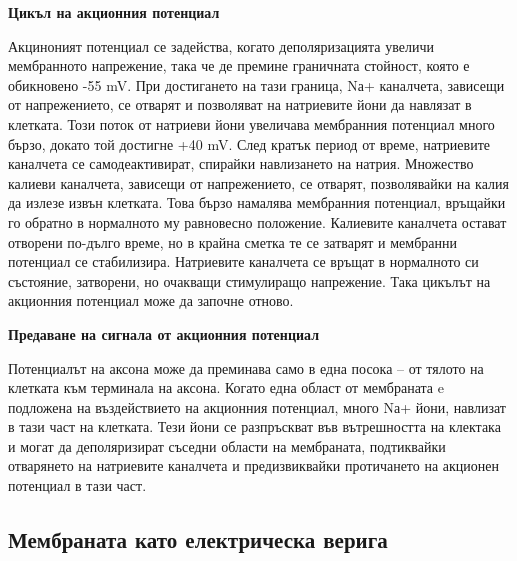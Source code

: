 \documentclass{article}
\begin{document}
\vspace{5mm} %
\textbf{Цикъл на акционния потенциал}

Акциноният потенциал се задейства, когато деполяризацията увеличи мембранното напрежение, така че де премине граничната стойност, която е обикновено -55 mV. При достигането на тази граница, Nа+ каналчета, зависещи от напрежението, се отварят и позволяват на натриевите йони да навлязат в клетката. Този поток от натриеви йони увеличава мембранния потенциал много бързо, докато той достигне +40 mV. След кратък период от време, натриевите каналчета се самодеактивират, спирайки навлизането на натрия. Множество калиеви каналчета, зависещи от напрежението, се отварят, позволявайки на калия да излезе извън клетката. Това бързо намалява мембранния потенциал, връщайки го обратно в нормалното му равновесно положение. Калиевите каналчета остават отворени по-дълго време, но в крайна сметка те се затварят и мембранни потенциал се стабилизира. Натриевите каналчета се връщат в нормалното си състояние, затворени, но очакващи стимулиращо напрежение. Така цикълът на акционния потенциал може да започне отново.

\vspace{5mm} %
\textbf{Предаване на сигнала от акционния потенциал}

Потенциалът на аксона може да преминава само в една посока -- от тялото на клетката към терминала на аксона. Когато една област от мембраната e подложена на въздействието на акционния потенциал, много Nа+ йони, навлизат в тази част на клетката. Тези йони се разпръскват във вътрешността на клектака и могат да деполяризират съседни области на мембраната, подтиквайки отварянето на натриевите каналчета и предизвиквайки протичането на акционен потенциал в тази част.

\vspace{5mm} %
\subsection{Мембраната като електрическа верига}
\end{document}
